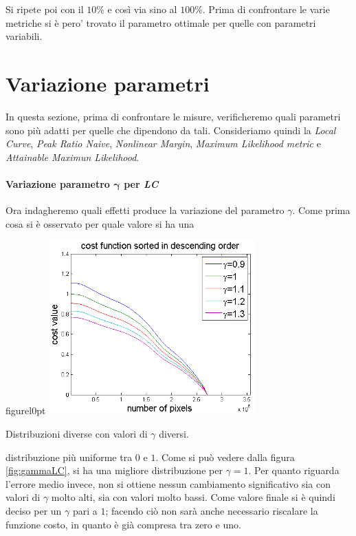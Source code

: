 \documentclass[12pt]{report}
\begin{document}
		\noindent Si ripete poi con il $10\%$ e così via sino al $100\%$. Prima di confrontare le varie metriche si è pero' trovato il parametro ottimale per quelle con parametri variabili.
		
		\section{Variazione parametri}
		\label{sec:parametri}
		
			In questa sezione, prima di confrontare le misure, verificheremo quali parametri sono più adatti per quelle che dipendono da tali. Consideriamo quindi la \textit{Local Curve}, \textit{Peak Ratio Naive}, \textit{Nonlinear Margin}, \textit{Maximum Likelihood metric} e \textit{Attainable Maximun Likelihood}.
		
			\paragraph{Variazione parametro $\bm{\gamma}$ per \textit{LC}}
			\label{par:gamma}
		
				Ora indagheremo quali effetti produce la variazione del parametro $\gamma$. Come prima cosa si è osservato per quale valore si ha una
		
		
				\begin{wrapfloat}{figure}{l}{0pt}
					\includegraphics[width=0.6\textwidth]{./figures/gamma_LC.png}
					\caption{Distribuzioni diverse con valori di $\gamma$ diversi.}
					\label{fig:gammaLC}
				\end{wrapfloat} 
		
				\noindent distribuzione più uniforme tra $0$ e $1$. Come si può vedere dalla figura \ref{fig:gammaLC}, si ha una migliore distribuzione per $\gamma=1$. Per quanto riguarda l'errore medio invece, non si ottiene nessun cambiamento significativo sia con valori di $\gamma$ molto alti, sia con valori molto bassi. Come valore finale si è quindi deciso per un $\gamma$ pari a $1$; facendo ciò non sarà anche necessario riscalare la funzione costo, in quanto è già compresa tra zero e uno. \newline \newline \newline
		
\end{document}
